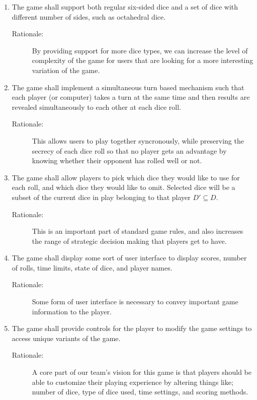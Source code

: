 \begin{enumerate}[label=R\arabic*, start=1, left=0pt]
    \item \label{R5} The game shall support both regular six-sided dice and a set of dice with different number of sides, such as octahedral dice.
    \begin{description}
        \item[Rationale:] By providing support for more dice types, we can increase the level of complexity of the game for users that are looking for a more interesting variation of the game.
    \end{description}

    \item \label{R6} The game shall implement a simultaneous turn based mechanism such that each player (or computer) takes a turn at the same time and then results are revealed simultaneously to each other at each dice roll.
    \begin{description}
        \item[Rationale:] This allows users to play together syncronously, while preserving the secrecy of each dice roll so that no player gets an advantage by knowing whether their opponent has rolled well or not.
    \end{description}

    \item \label{R7} The game shall allow players to pick which dice they would like to use for each roll, and which dice they would like to omit. Selected dice will be a subset of the current dice in play belonging to that player $D' \subseteq D$.
    \begin{description}
        \item[Rationale:] This is an important part of standard game rules, and also increases the range of strategic decision making that players get to have.
    \end{description}

    \item \label{R8} The game shall display some sort of user interface to display scores, number of rolls, time limits, state of dice, and player names.
    \begin{description}
        \item[Rationale:] Some form of user interface is necessary to convey important game information to the player.
    \end{description}

    \item \label{R9} The game shall provide controls for the player to modify the game settings to access unique variants of the game.
    \begin{description}
        \item[Rationale:] A core part of our team's vision for this game is that players should be able to customize their playing experience by altering things like; number of dice, type of dice used, time settings, and scoring methods.
    \end{description}


\end{enumerate}
